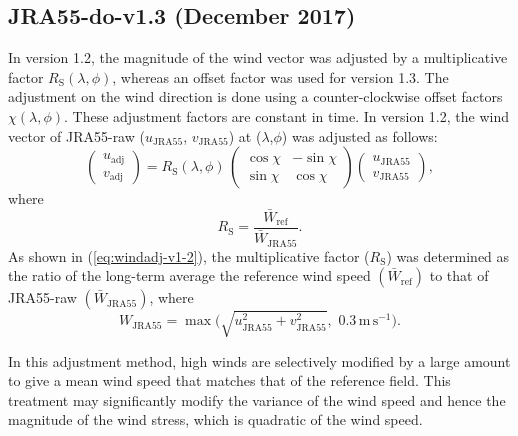 \documentclass[dvipdfmx]{elsarticle_mod}
\begin{document}
\subsection{JRA55-do-v1.3 (December 2017)}

\label{app:version_1_3}

In version 1.2, the magnitude of the wind vector was adjusted by a multiplicative factor $R_{\mathrm{S}}(\lambda,\phi)$, whereas an offset factor was used for version 1.3. The adjustment on the wind direction is done using a counter-clockwise offset factors $\chi(\lambda,\phi)$. These adjustment factors are constant in time. In version 1.2, the wind vector of JRA55-raw ($u_{\mathrm{JRA55}}$, $v_{\mathrm{JRA55}}$) at ($\lambda$,$\phi$) was adjusted as follows:
\begin{equation}
  \left(
    \begin{array}{c}
      u_{\mathrm{adj}} \\
      v_{\mathrm{adj}} 
    \end{array}
  \right)
  =
  R_{\mathrm{S}}(\lambda,\phi) \, \left(
    \begin{array}{rr}
      \cos \chi & -\sin \chi \\
      \sin \chi & \cos \chi
    \end{array}
  \right)
  \left(
    \begin{array}{c}
      u_{\mathrm{JRA55}} \\
      v_{\mathrm{JRA55}}
    \end{array}
  \right),
\end{equation}
where
\begin{equation}
  R_{\mathrm{S}} = \frac{\bar{W}_{\mathrm{ref}}}{\bar{W}_{\mathrm{JRA55}}}. \label{eq:windadj-v1-2}
\end{equation}
As shown in (\ref{eq:windadj-v1-2}), the multiplicative factor ($R_{\mathrm{S}}$) was determined as the ratio of the long-term average the reference wind speed $(\bar{W}_{\mathrm{ref}})$ to that of JRA55-raw $(\bar{W}_{\mathrm{JRA55}})$, where
\begin{equation}
   W_{\mathrm{JRA55}} = \max\big(\sqrt{u^2_{\mathrm{JRA55}}+v^2_{\mathrm{JRA55}}},\,\, 0.3\, \mathrm{m}\,\mathrm{s}^{-1}\big).
 \label{eq:floor-wind}
\end{equation}

In this adjustment method, high winds are selectively modified by a large amount to give a mean wind speed that matches that of the reference field. This treatment may significantly modify the variance of the wind speed and hence the magnitude of the wind stress, which is quadratic of the wind speed.
\end{document}
